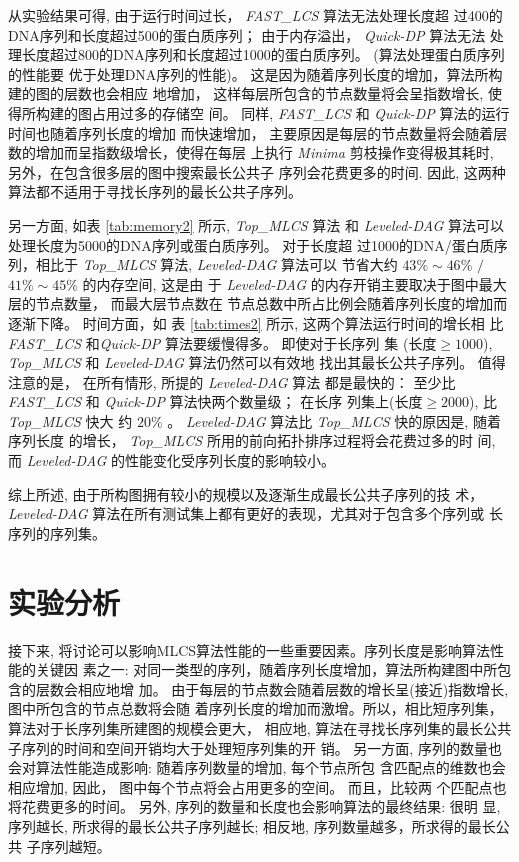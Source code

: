 \documentclass[utf8]{frontiersSCNS} %
\begin{document}
从实验结果可得, 由于运行时间过长， \emph{FAST\_LCS} 算法无法处理长度超
过400的DNA序列和长度超过500的蛋白质序列； 由于内存溢出， \emph{Quick-DP} 算法无法
处理长度超过800的DNA序列和长度超过1000的蛋白质序列。 (算法处理蛋白质序列的性能要
优于处理DNA序列的性能)。 这是因为随着序列长度的增加，算法所构建的图的层数也会相应
地增加， 这样每层所包含的节点数量将会呈指数增长, 使得所构建的图占用过多的存储空
间。 同样, \emph{FAST\_LCS} 和 \emph{Quick-DP} 算法的运行时间也随着序列长度的增加
而快速增加， 主要原因是每层的节点数量将会随着层数的增加而呈指数级增长，使得在每层
上执行 \emph{Minima} 剪枝操作变得极其耗时, 另外，在包含很多层的图中搜索最长公共子
序列会花费更多的时间. 因此, 这两种算法都不适用于寻找长序列的最长公共子序列。

另一方面, 如表 \ref{tab:memory2} 所示, \emph{Top\_MLCS} 算法
和 \emph{Leveled-DAG} 算法可以处理长度为5000的DNA序列或蛋白质序列。 对于长度超
过1000的DNA/蛋白质序列，相比于 \emph{Top\_MLCS} 算法, \emph{Leveled-DAG} 算法可以
节省大约 $43\% \sim 46\%$ $/$ $41\% \sim 45\%$ 的内存空间, 这是由
于 \emph{Leveled-DAG} 的内存开销主要取决于图中最大层的节点数量， 而最大层节点数在
节点总数中所占比例会随着序列长度的增加而逐渐下降。 时间方面，如
表 \ref{tab:times2} 所示, 这两个算法运行时间的增长相
比 \emph{FAST\_LCS} 和\emph{Quick-DP} 算法要缓慢得多。 即使对于长序列
集 ($长度 \geq 1000$), \emph{Top\_MLCS} 和 \emph{Leveled-DAG} 算法仍然可以有效地
找出其最长公共子序列。 值得注意的是， 在所有情形, 所提的 \emph{Leveled-DAG} 算法
都是最快的： 至少比 \emph{FAST\_LCS} 和 \emph{Quick-DP} 算法快两个数量级； 在长序
列集上($长度 \geq 2000$), 比 \emph{Top\_MLCS} 快大
约 $20\%$ 。 \emph{Leveled-DAG} 算法比 \emph{Top\_MLCS} 快的原因是, 随着序列长度
的增长， \emph{Top\_MLCS} 所用的前向拓扑排序过程将会花费过多的时
间, 而 \emph{Leveled-DAG} 的性能变化受序列长度的影响较小。

综上所述, 由于所构图拥有较小的规模以及逐渐生成最长公共子序列的技
术， \emph{Leveled-DAG} 算法在所有测试集上都有更好的表现，尤其对于包含多个序列或
长序列的序列集。

\section{实验分析}

接下来, 将讨论可以影响MLCS算法性能的一些重要因素。序列长度是影响算法性能的关键因
素之一: 对同一类型的序列，随着序列长度增加，算法所构建图中所包含的层数会相应地增
加。 由于每层的节点数会随着层数的增长呈(接近)指数增长, 图中所包含的节点总数将会随
着序列长度的增加而激增。所以，相比短序列集，算法对于长序列集所建图的规模会更大，
相应地, 算法在寻找长序列集的最长公共子序列的时间和空间开销均大于处理短序列集的开
销。 另一方面, 序列的数量也会对算法性能造成影响: 随着序列数量的增加, 每个节点所包
含匹配点的维数也会相应增加, 因此， 图中每个节点将会占用更多的空间。 而且，比较两
个匹配点也将花费更多的时间。 另外, 序列的数量和长度也会影响算法的最终结果: 很明
显, 序列越长, 所求得的最长公共子序列越长; 相反地, 序列数量越多，所求得的最长公共
子序列越短。
\end{document}
